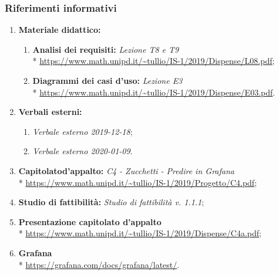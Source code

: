 		\subsubsection{Riferimenti informativi}
			\begin{enumerate}
				\item \textbf{Materiale didattico:}
				\begin{enumerate}
					\item \textbf{Analisi dei requisiti:} \textit{Lezione T8 e T9} \\*
					\url{https://www.math.unipd.it/~tullio/IS-1/2019/Dispense/L08.pdf};
					\item \textbf{Diagrammi dei casi d'uso:} \textit{Lezione E3} \\*
					\url{https://www.math.unipd.it/~tullio/IS-1/2019/Dispense/E03.pdf}.
				\end{enumerate}
				\item \textbf{Verbali esterni:} 
				\begin{enumerate}
					\item \textit{Verbale esterno 2019-12-18};
					\item \textit{Verbale esterno 2020-01-09}.
				\end{enumerate}
				\item \textbf{Capitolato\glosp d'appalto:} \textit{C4 - Zucchetti - Predire in Grafana} \\*
				\url{https://www.math.unipd.it/~tullio/IS-1/2019/Progetto/C4.pdf};
				\item \textbf{Studio di fattibilità:} \textit{Studio di fattibilità v. 1.1.1};
				\item \textbf{Presentazione capitolato d'appalto} \\*
					\url{https://www.math.unipd.it/~tullio/IS-1/2019/Dispense/C4a.pdf};
				\item \textbf{Grafana} \\*
					\url{https://grafana.com/docs/grafana/latest/}.
			\end{enumerate}
